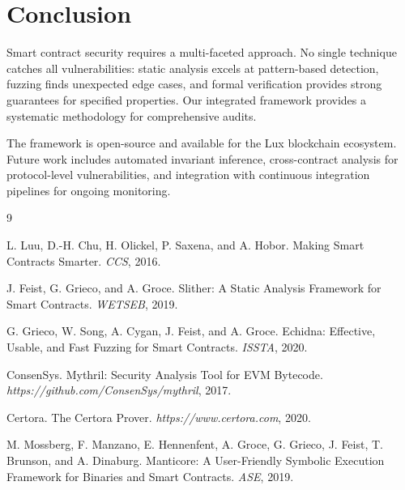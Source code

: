 \documentclass[11pt,a4paper]{article}
\theoremstyle{definition}
\begin{document}
\section{Conclusion}

Smart contract security requires a multi-faceted approach. No single technique catches all vulnerabilities: static analysis excels at pattern-based detection, fuzzing finds unexpected edge cases, and formal verification provides strong guarantees for specified properties. Our integrated framework provides a systematic methodology for comprehensive audits.

The framework is open-source and available for the Lux blockchain ecosystem. Future work includes automated invariant inference, cross-contract analysis for protocol-level vulnerabilities, and integration with continuous integration pipelines for ongoing monitoring.


\begin{thebibliography}{9}

L. Luu, D.-H. Chu, H. Olickel, P. Saxena, and A. Hobor.
Making Smart Contracts Smarter.
\textit{CCS}, 2016.

J. Feist, G. Grieco, and A. Groce.
Slither: A Static Analysis Framework for Smart Contracts.
\textit{WETSEB}, 2019.

G. Grieco, W. Song, A. Cygan, J. Feist, and A. Groce.
Echidna: Effective, Usable, and Fast Fuzzing for Smart Contracts.
\textit{ISSTA}, 2020.

ConsenSys.
Mythril: Security Analysis Tool for EVM Bytecode.
\textit{https://github.com/ConsenSys/mythril}, 2017.

Certora.
The Certora Prover.
\textit{https://www.certora.com}, 2020.

M. Mossberg, F. Manzano, E. Hennenfent, A. Groce, G. Grieco, J. Feist, T. Brunson, and A. Dinaburg.
Manticore: A User-Friendly Symbolic Execution Framework for Binaries and Smart Contracts.
\textit{ASE}, 2019.

\end{thebibliography}
\end{document}
